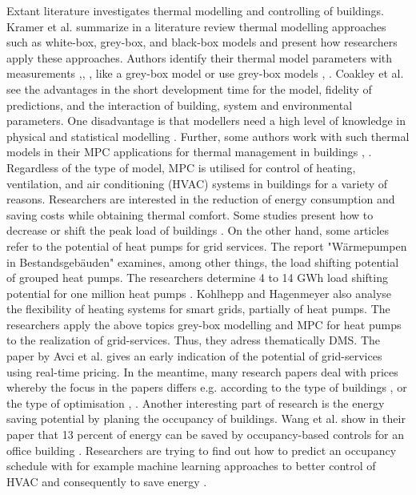     Extant literature investigates thermal modelling and controlling of buildings. Kramer et al. \cite{Kramer.2012} summarize in a literature review thermal modelling approaches such as white-box, grey-box, and black-box models and present how researchers apply these approaches. Authors identify their thermal model parameters with measurements \cite{Siroky.2011},\cite{Hazyuk.2012}, \cite{Park.2011}, like a grey-box model or use grey-box models \cite{Freund.2020}, \cite{EvelynSperber.2019}. Coakley et al. \cite{Coakley.2014} see the advantages in the short development time for the model, fidelity of predictions, and the interaction of building, system and environmental parameters. One disadvantage is that modellers need a high level of knowledge in physical and statistical modelling \cite{Coakley.2014}.
    \newline
    Further, some authors work with such thermal models in their MPC applications for thermal management in buildings \cite{JiriCigler.}, \cite{Hazyuk.2012b}. 
    \newline
    Regardless of the type of model, MPC is utilised for control of heating, ventilation, and air conditioning (HVAC) systems in buildings for a variety of reasons. Researchers are interested in the reduction of energy consumption \cite{Hazyuk.2012b} and saving costs \cite{Zwickel.2019} while obtaining thermal comfort. Some studies present how to decrease or shift the peak load of buildings \cite{Oldewurtel.2010}.
    \newline
    On the other hand, some articles refer to the potential of heat pumps for grid services.
    The report "Wärmepumpen in Bestandsgebäuden" examines, among other things, the load shifting potential of grouped heat pumps. The researchers determine 4 to 14 GWh load shifting potential for one million heat pumps \cite{WPimBestand.2020}.
    Kohlhepp and Hagenmeyer \cite{Kohlhepp.2017} also analyse the flexibility of heating systems for smart grids, partially of heat pumps. 
    \newline
    The researchers apply the above topics grey-box modelling and MPC for heat pumps to the realization of grid-services. Thus, they adress thematically DMS. The paper by Avci et al. \cite{Avci.2013} gives an early indication of the potential of grid-services using real-time pricing. In the meantime, many research papers deal with prices whereby the focus in the papers differs e.g. according to the type of buildings \cite{Bianchini.2019}, \cite{Kim.2018} or the type of optimisation \cite{Bianchini.2019}, \cite{Bianchini.2016}.\newline 
    Another interesting part of research is the energy saving potential by planing the occupancy of buildings. Wang et al. show in their paper that 13 percent of energy can be saved by occupancy-based controls for an office building \cite{Wang.2019}. Researchers are trying to find out how to predict an occupancy schedule with for example machine learning approaches to better control of HVAC and consequently to save energy \cite{Liang.2016}.\newline
    
